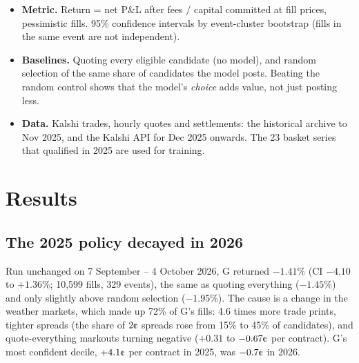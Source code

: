 \documentclass[11pt,a4paper]{article}
\newcommand{\cent}{\text{\textcent}}
\begin{document}
\begin{itemize}
  \item \textbf{Metric.} Return = net P\&L after fees $/$ capital committed at fill prices, pessimistic fills.
        95\% confidence intervals by event-cluster bootstrap (fills in the same event are not independent).
  \item \textbf{Baselines.} Quoting every eligible candidate (no model), and random selection of the same share of
        candidates the model posts. Beating the random control shows that the model's \emph{choice} adds value,
        not just posting less.
  \item \textbf{Data.} Kalshi trades, hourly quotes and settlements: the historical archive to Nov 2025, and the
        Kalshi API for Dec 2025 onwards. The 23 basket series that qualified in 2025 are used for training.
\end{itemize}

\section{Results}

\subsection{The 2025 policy decayed in 2026}
Run unchanged on 7 September -- 4 October 2026, G returned $-1.41\%$ (CI $-4.10$ to $+1.36\%$; 10,599 fills,
329 events), the same as quoting everything ($-1.45\%$) and only slightly above random selection ($-1.95\%$).
The cause is a change in the weather markets, which made up 72\% of G's fills: 4.6 times more trade prints,
tighter spreads (the share of $2\cent$ spreads rose from 15\% to 45\% of candidates), and quote-everything
markouts turning negative ($+0.31$ to $-0.67\cent$ per contract). G's most confident decile, $+4.1\cent$ per
contract in 2025, was $-0.7\cent$ in 2026.
\end{document}
